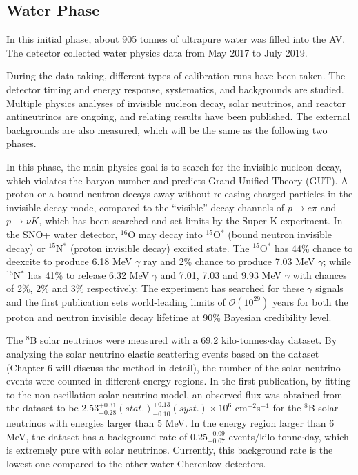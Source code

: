 \subsection{Water Phase} \label{sect:waterPhase}
In this initial phase, about 905 tonnes of ultrapure water was filled into the AV. The detector collected water physics data from May 2017 to July 2019.

During the data-taking, different types of calibration runs have been taken. The detector timing and energy response, systematics, and backgrounds are studied. Multiple physics analyses of invisible nucleon decay, solar neutrinos, and reactor antineutrinos are ongoing, and relating results have been published\cite{anderson2019search,anderson2019measurement,anderson2020measurement,anderson2021optical}. The external backgrounds are also measured, which will be the same as the following two phases.

In this phase, the main physics goal is to search for the invisible nucleon decay, which violates the baryon number and predicts Grand Unified Theory (GUT). A proton or a bound neutron decays away without releasing charged particles in the invisible decay mode, compared to the ``visible'' decay channels of $p\to e\pi$ and $p\to\nu K$, which has been searched and set limits by the Super-K experiment. In the SNO+ water detector, $^{16}$O may decay into $^{15}$O$^*$ (bound neutron invisible decay) or $ ^{15}$N$^*$ (proton invisible decay) excited state. The $^{15}$O$^*$ has 44\% chance to deexcite to produce 6.18 MeV $\gamma$ ray and 2\% chance to produce 7.03 MeV $\gamma$; while $^{15}$N$^*$ has 41\% to release 6.32 MeV $\gamma$ and 7.01, 7.03 and 9.93 MeV $\gamma$ with chances of 2\%, 2\% and 3\% respectively. The experiment has searched for these $\gamma$ signals and the first publication sets world-leading limits of $\mathcal{O}(10^{29})$ years for both the proton and neutron invisible decay lifetime at 90\% Bayesian credibility level\cite{anderson2019search}. 

The $^8$B solar neutrinos were measured with a 69.2 kilo-tonnes$\cdot$day dataset. By analyzing the solar neutrino elastic scattering events based on the dataset (Chapter 6 will discuss the method in detail), the number of the solar neutrino events were counted in different energy regions. In the first publication\cite{anderson2019measurement}, by fitting to the non-oscillation solar neutrino model, an observed flux was obtained from the dataset to be $2.53^{+0.31}_{-0.28}(stat.)^{+0.13}_{-0.10}(syst.)\times 10^6$ cm$^{-2}$s$^{-1}$ for the $^8$B solar neutrinos with energies larger than 5 MeV. In the energy region larger than 6 MeV, the dataset has a background rate of $0.25^{+0.09}_{-0.07}$ events/kilo-tonne$\cdot$day, which is extremely pure with solar neutrinos. Currently, this background rate is the lowest one compared to the other water Cherenkov detectors\cite{anderson2019measurement}. 

